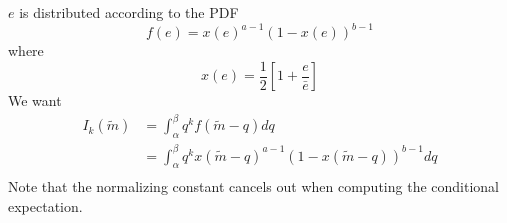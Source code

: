\documentclass{article}
\begin{document}
\noindent $e$ is distributed according to the PDF
\begin{equation}
	f(e)=x(e)^{a-1}(1-x(e))^{b-1}
\end{equation}
where
\begin{equation}
	x(e)=\frac{1}{2}\left[1+\frac{e}{\bar{e}}\right]
\end{equation}
We want
\begin{align}
	I_{k}(\widetilde{m})&=\int_{\alpha}^{\beta}{q^{k}f(\tilde{m}-q)dq}\\
	&=\int_{\alpha}^{\beta}{q^{k}x(\tilde{m}-q)^{a-1}(1-x(\tilde{m}-q))^{b-1}dq}\\
\end{align}
Note that the normalizing constant cancels out when computing the conditional expectation. 
\end{document}

